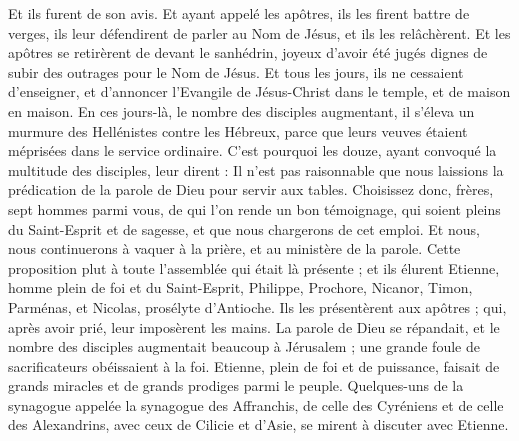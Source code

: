 \begin{multicols}{2}
Et ils furent de son avis. Et ayant appelé les apôtres, ils les firent battre de verges, ils leur défendirent de parler au Nom de Jésus, et ils les relâchèrent.
Et les apôtres se retirèrent de devant le sanhédrin, joyeux d'avoir été jugés dignes de subir des outrages pour le Nom de Jésus.
Et tous les jours, ils ne cessaient d'enseigner, et d'annoncer l’Evangile de Jésus-Christ dans le temple, et de maison en maison.
\VerseOne{}En ces jours-là, le nombre des disciples augmentant, il s'éleva un murmure des Hellénistes contre les Hébreux, parce que leurs veuves étaient méprisées dans le service ordinaire.
C'est pourquoi les douze, ayant convoqué la multitude des disciples, leur dirent : Il n'est pas raisonnable que nous laissions la prédication de la parole de Dieu pour servir aux tables.
Choisissez donc, frères, sept hommes parmi vous, de qui l’on rende un bon témoignage, qui soient pleins du Saint-Esprit et de sagesse, et que nous chargerons de cet emploi.
Et nous, nous continuerons à vaquer à la prière, et au ministère de la parole.
Cette proposition plut à toute l'assemblée qui était là présente ; et ils élurent Etienne, homme plein de foi et du Saint-Esprit, Philippe, Prochore, Nicanor, Timon, Parménas, et Nicolas, prosélyte d'Antioche.
Ils les présentèrent aux apôtres ; qui, après avoir prié, leur imposèrent les mains.
La parole de Dieu se répandait, et le nombre des disciples augmentait beaucoup à Jérusalem ; une grande foule de sacrificateurs obéissaient à la foi.
Etienne, plein de foi et de puissance, faisait de grands miracles et de grands prodiges parmi le peuple.
Quelques-uns de la synagogue appelée la synagogue des Affranchis, de celle des Cyréniens et de celle des Alexandrins, avec ceux de Cilicie et d'Asie, se mirent à discuter avec Etienne.

\end{multicols}
